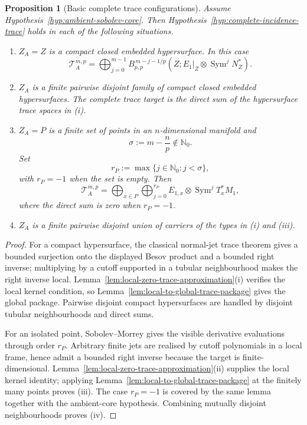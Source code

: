 \documentclass[11pt]{article}
\theoremstyle{plain}
\newtheorem{proposition}[theorem]{Proposition}
\theoremstyle{definition}
\begin{document}
\begin{proposition}[Basic complete trace configurations]
\label{prop:basic-complete-trace-configurations}
Assume Hypothesis~\ref{hyp:ambient-sobolev-core}. Then
Hypothesis~\ref{hyp:complete-incidence-trace} holds in each of the
following situations.

\begin{enumerate}[label=\textup{(\roman*)}]
  \item \(Z_A=Z\) is a compact closed embedded hypersurface. In this
        case
        \[
          \mathcal T_A^{m,p}
          =
          \bigoplus_{j=0}^{m-1}
          B_{p,p}^{\,m-j-1/p}
          \left(
            Z;
            E_1|_Z\otimes\operatorname{Sym}^jN_Z^*
          \right).
        \]

  \item \(Z_A\) is a finite pairwise disjoint family of compact closed
        embedded hypersurfaces. The complete trace target is the direct
        sum of the hypersurface trace spaces in \textup{(i)}.

  \item \(Z_A=P\) is a finite set of points in an \(n\)-dimensional
        manifold and
        \[
          \sigma:=m-\frac{n}{p}
          \notin
          \mathbb N_0.
        \]
        Set
        \[
          r_P
          :=
          \max\{j\in\mathbb N_0:j<\sigma\},
        \]
        with \(r_P=-1\) when the set is empty. Then
        \[
          \mathcal T_A^{m,p}
          =
          \bigoplus_{x\in P}
          \bigoplus_{j=0}^{r_P}
          E_{1,x}\otimes\operatorname{Sym}^jT_x^*M_1,
        \]
        where the direct sum is zero when \(r_P=-1\).

  \item \(Z_A\) is a finite pairwise disjoint union of carriers of the
        types in \textup{(i)} and \textup{(iii)}.
\end{enumerate}
\end{proposition}

\begin{proof}
For a compact hypersurface, the classical normal-jet trace theorem gives a bounded surjection onto the displayed Besov product and a bounded right inverse; multiplying by a cutoff supported in a tubular neighbourhood makes the right inverse local. Lemma~\ref{lem:local-zero-trace-approximation}\textup{(i)} verifies the local kernel condition, so Lemma~\ref{lem:local-to-global-trace-package} gives the global package. Pairwise disjoint compact hypersurfaces are handled by disjoint tubular neighbourhoods and direct sums.

For an isolated point, Sobolev--Morrey gives the visible derivative evaluations through order \(r_P\). Arbitrary finite jets are realised by cutoff polynomials in a local frame, hence admit a bounded right inverse because the target is finite-dimensional. Lemma~\ref{lem:local-zero-trace-approximation}\textup{(ii)} supplies the local kernel identity; applying Lemma~\ref{lem:local-to-global-trace-package} at the finitely many points proves \textup{(iii)}. The case \(r_P=-1\) is covered by the same lemma together with the ambient-core hypothesis. Combining mutually disjoint neighbourhoods proves \textup{(iv)}.
\end{proof}
\end{document}
